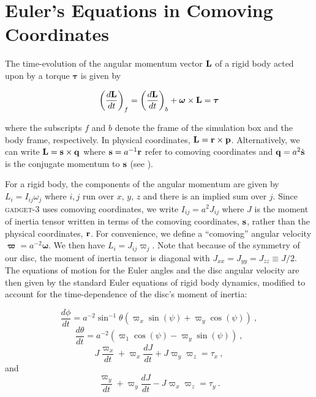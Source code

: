\appendix

\chapter{Euler's Equations in Comoving Coordinates} \label{sec:derivation}

The time-evolution of the angular momentum vector ${\bf L}$ of a rigid
body acted upon by a torque $\boldsymbol{\tau}$ is given by

\begin{equation}
  \left(\frac{{d} \bf{L}}{{d} t}\right)_f = \left(\frac{{d} \bf{L}}{{d} t}\right)_b  + \boldsymbol \omega \times \bf{L}
  = \boldsymbol{\tau}
\end{equation}

\noindent where the subscripts $f$ and $b$ denote the frame of the
simulation box and the body frame, respectively.  In physical
coordinates, ${\bf L} = {\bf r \times p}$.  Alternatively, we can
write ${\bf L} = {\bf s\times q}$ where ${\bf s} = a^{-1}{\bf r}$
refer to comoving coordinates and ${\bf q} = a^2\dot{\bf s}$ is the
conjugate momentum to ${\bf s}$ (see \citet{QuinnIntegrators}).

For a rigid body, the components of the angular momentum are given by $L_i = I_{ij} \omega_j$ where $i,j$ run over $x,\,y,\,z$ and there is an implied sum over $j$.  Since \textsc{gadget-3} uses comoving coordinates, we write $I_{ij} = a^2 J_{ij}$ where $J$ is the moment of inertia tensor written in terms of the comoving coordinates, ${\bf s}$, rather than the physical coordinates, ${\bf r}$.  For convenience, we define a ``comoving'' angular velocity $\boldsymbol{\varpi} = a^{-2}\boldsymbol{\omega}$.  We then have $L_i = J_{ij} \varpi_j$.  Note that because of the symmetry of our disc, the moment of inertia tensor is diagonal with $J_{xx} = J_{yy}= J_{zz} \equiv J/2$.  The equations of motion for the Euler angles and the disc angular velocity are then given by the standard Euler equations of rigid body dynamics, modified to account for the time-dependence of the disc's moment of inertia:

\begin{equation}
\frac{d\phi}{dt} = a^{-2}\sin^{-1}{\theta} \left (\varpi_x\sin(\psi) + \varpi_y \cos(\psi)\right )~,
\end{equation}
\begin{equation}
\frac{d\theta}{dt} = a^{-2}\left (  \varpi_1\cos(\psi) - \varpi_y \sin(\psi)\right )~,
\end{equation}
\begin{equation}
J\frac{\varpi_x}{dt} + \varpi_x\frac{dJ}{dt}
+ J\varpi_y\varpi_z
=  \tau_x~,
\end{equation}
and
\begin{equation}
\frac{\varpi_y}{dt} + \varpi_y\frac{dJ}{dt}
- J\varpi_x\varpi_z
=  \tau_y~.
\end{equation}

